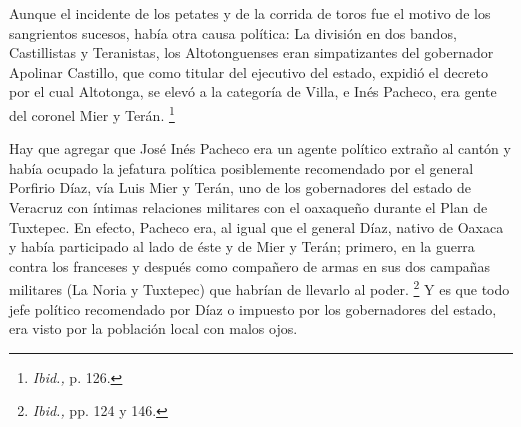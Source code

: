 \documentclass[14pt,twoside,final]{extbook} %
\let\oldfootnote\footnote
\renewcommand\footnote[1]{%
\oldfootnote{\hspace{1mm}#1}}
\begin{document}
\begin{quoting}
Aunque el incidente de los petates y de la corrida de toros fue el motivo de los sangrientos sucesos, había otra causa política: La división en dos bandos, Castillistas y Teranistas, los Altotonguenses eran simpatizantes del gobernador Apolinar Castillo, que como titular del ejecutivo del estado, expidió el decreto por el cual Altotonga, se elevó a la categoría de Villa, e Inés Pacheco, era gente del coronel Mier y Terán.\footnote{\emph{Ibid.,} p. 126.}
\end{quoting}
Hay que agregar que José Inés Pacheco era un agente político extraño al cantón y había ocupado la jefatura política posiblemente recomendado por el general Porfirio Díaz, vía Luis Mier y Terán, uno de los gobernadores del estado de Veracruz con íntimas relaciones militares con el oaxaqueño durante el Plan de Tuxtepec. En efecto, Pacheco era, al igual que el general Díaz, nativo de Oaxaca y había participado al lado de éste y de Mier y Terán; primero, en la guerra contra los franceses y después como compañero de armas en sus dos campañas militares (La Noria y Tuxtepec) que habrían de llevarlo al poder.\footnote{\emph{Ibid.,} pp. 124 y 146.} Y es que todo jefe político recomendado por Díaz o impuesto por los gobernadores del estado, era visto por la población local con malos ojos.
\end{document}
